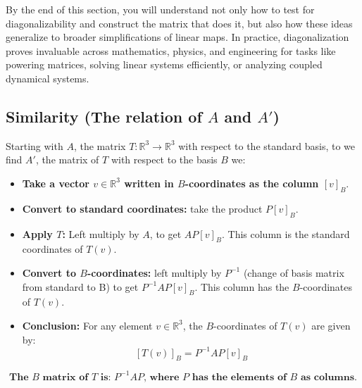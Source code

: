 \documentclass[a4paper, 9pt]{extarticle}
\begin{document}
\noindent By the end of this section, you will understand not only how to test for diagonalizability and construct the matrix that does it, but also how these ideas generalize to broader simplifications of linear maps. In practice, diagonalization proves invaluable across mathematics, physics, and engineering for tasks like powering matrices, solving linear systems efficiently, or analyzing coupled dynamical systems.\\[2ex]

\subsection{Similarity (The relation of $A$ and $A'$)}
Starting with $A$, the matrix $T: \mathbb{R}^3 \to \mathbb{R}^3$ with respect to the standard basis, to we find $A'$, the matrix of $T$ with respect to the basis $B$ we:
\begin{itemize}
  \item \textbf{Take a vector $v \in \mathbb{R}^3$ written in $B$-coordinates as the column $[v]_B$}.
  \item \textbf{Convert to standard coordinates:} take the product $P[v]_B$.
  \item \textbf{Apply $T$:} Left multiply by $A$, to get $AP[v]_B$. This column is the standard coordinates of $T(v)$.
  \item \textbf{Convert to $B$-coordinates:} left multiply by $P^{-1}$ (change of basis matrix from standard to B) to get $P^{-1}AP[v]_B$. This column has the $B$-coordinates of $T(v)$.
  \item \textbf{Conclusion:}  For any element $v \in \mathbb{R}^3$, the $B$-coordinates of $T(v)$ are given by:
        $$
          [T(v)]_B = P^{-1}AP[v]_B
        $$
\end{itemize}
$$\textbf{The $B$ matrix of $T$ is: $P^{-1}AP$, where $P$ has the elements of $B$ as columns.}$$
\end{document}
